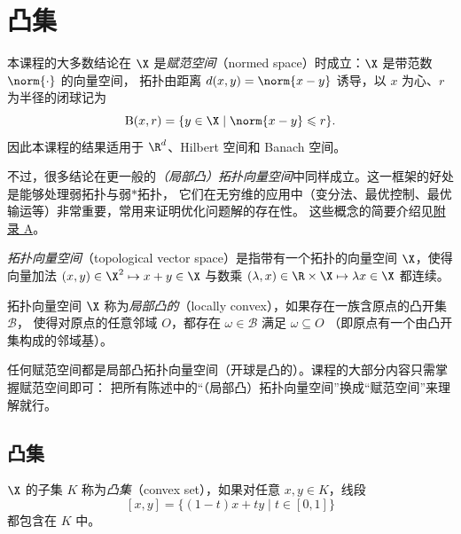 \chapter{凸集}
\label{ch:ch01}

本课程的大多数结论在 $\X$ 是\emph{赋范空间}（normed space）时成立：$\X$ 是带范数 $\norm{\cdot}$ 的向量空间，
拓扑由距离 $d(x,y)=\norm{x-y}$ 诱导，以 $x$ 为心、$r$ 为半径的闭球记为
\[
  \mathrm{B}(x,r)=\{y\in\X \mid \norm{x-y}\leqslant r\}.
\]
因此本课程的结果适用于 $\R^d$、Hilbert 空间和 Banach 空间。

不过，很多结论在更一般的\emph{（局部凸）拓扑向量空间}中同样成立。这一框架的好处是能够处理弱拓扑与弱$*$拓扑，
它们在无穷维的应用中（变分法、最优控制、最优输运等）非常重要，常用来证明优化问题解的存在性。
这些概念的简要介绍见\hyperref[ch:appA]{附录 A}。

\begin{definition}[局部凸拓扑向量空间]
\label{def:1}
\emph{拓扑向量空间}（topological vector space）是指带有一个拓扑的向量空间 $\X$，使得向量加法
$(x,y)\in\X^2\mapsto x+y\in\X$ 与数乘 $(\lambda,x)\in\R\times\X\mapsto\lambda x\in\X$ 都连续。

拓扑向量空间 $\X$ 称为\emph{局部凸的}（locally convex），如果存在一族含原点的凸开集 $\mathcal B$，
使得对原点的任意邻域 $O$，都存在 $\omega\in\mathcal B$ 满足 $\omega\subseteq O$
（即原点有一个由凸开集构成的邻域基）。
\end{definition}

任何赋范空间都是局部凸拓扑向量空间（开球是凸的）。课程的大部分内容只需掌握赋范空间即可：
把所有陈述中的“（局部凸）拓扑向量空间”换成“赋范空间”来理解就行。

\section{凸集}

\begin{definition}[凸集]
\label{def:2}
$\X$ 的子集 $K$ 称为\emph{凸集}（convex set），如果对任意 $x,y\in K$，线段
\[
  [x,y]=\{(1-t)x+ty \mid t\in[0,1]\}
\]
都包含在 $K$ 中。
\end{definition}

